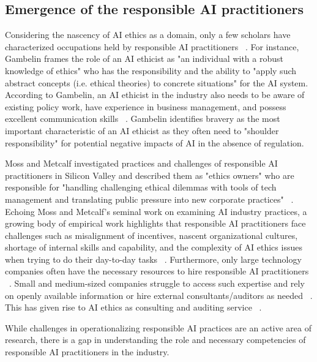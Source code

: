 \documentclass[sigconf]{acmart}
\begin{document}
\subsection{Emergence of the responsible AI practitioners}
 Considering the nascency of AI ethics as a domain, only a few scholars have characterized occupations held by responsible AI practitioners ~\cite{Widder2023-lh,Mantymaki2022-im}. For instance, Gambelin frames the role of an \ac{AI} ethicist as "an individual with a robust knowledge of ethics" who has the responsibility and the ability to "apply such abstract concepts (i.e. ethical theories) to concrete situations" for the \ac{AI} system. According to Gambelin, an \ac{AI} ethicist in the industry also needs to be aware of existing policy work, have experience in business management, and possess excellent communication skills ~\cite{Gambelin2021}. Gambelin identifies bravery as the most important characteristic of an \ac{AI} ethicist as they often need to "shoulder responsibility" for potential negative impacts of \ac{AI} in the absence of regulation. 
 
 Moss and Metcalf investigated practices and challenges of responsible AI practitioners in Silicon Valley and described them as "ethics owners" who are responsible for "handling challenging ethical dilemmas with tools of tech management and translating public pressure into new corporate practices" ~\cite{Moss2020}. Echoing Moss and Metcalf's seminal work on examining AI industry practices, a growing body of empirical work highlights that responsible AI practitioners face challenges such as misalignment of incentives, nascent organizational cultures, shortage of internal skills and capability, and the complexity of AI ethics issues when trying to do their day-to-day tasks ~\cite{Schiff2021-et, Nabavi2023-ce, Wang2023-js, Rakova2021c, Rismani2023-im}. Furthermore, only large technology companies often have the necessary resources to hire responsible AI practitioners ~\cite{Sloane2022-ag}. Small and medium-sized companies struggle to access such expertise and rely on openly available information or hire external consultants/auditors as needed ~\cite{Sloane2022-ag,Costanza-Chock2022-ch}. This has given rise to AI ethics as consulting and auditing service ~\cite{orcaa,ethical-advisory,Lab2019-ur}. 
 
 While challenges in operationalizing responsible \ac{AI} practices are an active area of research, there is a gap in understanding the role and necessary competencies of responsible \ac{AI} practitioners in the industry.  
\end{document}

